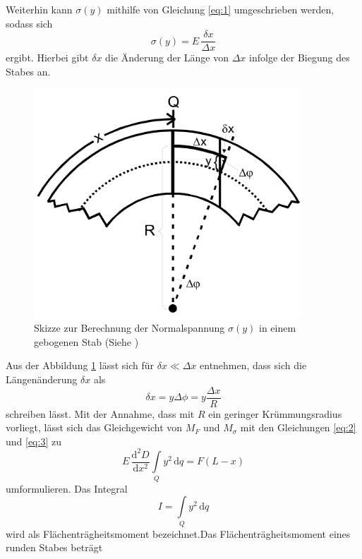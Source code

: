 Weiterhin kann $\sigma (y)$
mithilfe von Gleichung \ref{eq:1} umgeschrieben werden,
sodass sich 
\begin{equation}
    \sigma (y) = E \, \frac{\delta x}{\Delta x}
    \label{eq:4}
\end{equation}
\noindent ergibt. Hierbei gibt $\delta x$ die 
Änderung der Länge von $\Delta x$ infolge der
Biegung des Stabes an.
 

\begin{figure}[h]
    \centering
    \includegraphics[width=10cm]{Theorie4.png}
    \caption{Skizze zur Berechnung der Normalspannung $\sigma (y)$ in einem gebogenen Stab (Siehe \cite{sample})}
    \label{fig:theorie4}
\end{figure}

\noindent
Aus der Abbildung \ref{fig:theorie4} lässt sich für 
$\delta x \ll \Delta x$ entnehmen, dass sich 
die Längenänderung $\delta x$ als 
\begin{equation}
    \delta x = y \Delta \phi = y \frac{\Delta x}{R}
    \label{eq:5}
\end{equation}
\noindent schreiben lässt. Mit der Annahme, dass mit 
$R$ ein geringer Krümmungsradius vorliegt, lässt sich
das Gleichgewicht von $M_F$ und $M_{\sigma}$ mit den
Gleichungen \ref{eq:2} und \ref{eq:3} zu 
\begin{equation}
    E\, \frac{\mathrm{d}^2 D}{\mathrm{d} x^2} \int\limits_Q \! y^2\, \mathrm{d}q = F(L-x)
    \label{eq:6}
\end{equation}
\noindent umformulieren. Das Integral
\begin{equation}
    I = \int\limits_Q \! y^2\, \mathrm{d}q
    \label{eq:7}
\end{equation}
\noindent wird als Flächenträgheitsmoment bezeichnet.Das Flächenträgheitsmoment eines runden Stabes beträgt

